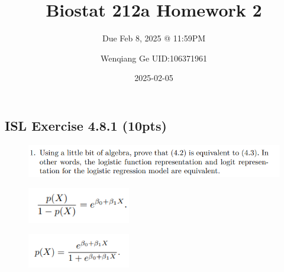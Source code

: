 \documentclass[
]{article}
\title{Biostat 212a Homework 2}
\subtitle{Due Feb 8, 2025 @ 11:59PM}
\author{Wenqiang Ge UID:106371961}
\date{2025-02-05}
\renewcommand*\contentsname{Table of contents}
\newcommand\contentsname{Table of contents}
\begin{document}
\maketitle
\ifdefined\Shaded\renewenvironment{Shaded}{\begin{tcolorbox}[interior hidden, boxrule=0pt, borderline west={3pt}{0pt}{shadecolor}, breakable, sharp corners, enhanced, frame hidden]}{\end{tcolorbox}}\fi

\renewcommand*\contentsname{Table of contents}
{
\hypersetup{linkcolor=}
\setcounter{tocdepth}{2}
\tableofcontents
}
\hypertarget{isl-exercise-4.8.1-10pts}{%
\subsection{ISL Exercise 4.8.1 (10pts)}\label{isl-exercise-4.8.1-10pts}}

\begin{figure}

{\centering \includegraphics[width=1\textwidth,height=\textheight]{images/clipboard-4077728568.png}

}

\end{figure}

\begin{figure}

{\centering \includegraphics[width=0.4\textwidth,height=\textheight]{images/clipboard-3304908845.png}

}

\end{figure}

\begin{figure}

{\centering \includegraphics[width=0.4\textwidth,height=\textheight]{images/clipboard-249183538.png}

}

\end{figure}
\end{document}
